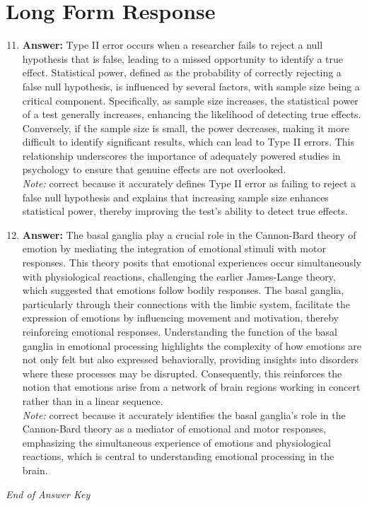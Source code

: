 \documentclass[12pt]{article}
\begin{document}
\section*{Long Form Response}
\begin{enumerate}[label=\arabic*.]
\setcounter{enumi}{10}
\item \textbf{Answer:} Type II error occurs when a researcher fails to reject a null hypothesis that is false, leading to a missed opportunity to identify a true effect. Statistical power, defined as the probability of correctly rejecting a false null hypothesis, is influenced by several factors, with sample size being a critical component. Specifically, as sample size increases, the statistical power of a test generally increases, enhancing the likelihood of detecting true effects. Conversely, if the sample size is small, the power decreases, making it more difficult to identify significant results, which can lead to Type II errors. This relationship underscores the importance of adequately powered studies in psychology to ensure that genuine effects are not overlooked.
\\ \textit{Note:} correct because it accurately defines Type II error as failing to reject a false null hypothesis and explains that increasing sample size enhances statistical power, thereby improving the test's ability to detect true effects.
\item \textbf{Answer:} The basal ganglia play a crucial role in the Cannon-Bard theory of emotion by mediating the integration of emotional stimuli with motor responses. This theory posits that emotional experiences occur simultaneously with physiological reactions, challenging the earlier James-Lange theory, which suggested that emotions follow bodily responses. The basal ganglia, particularly through their connections with the limbic system, facilitate the expression of emotions by influencing movement and motivation, thereby reinforcing emotional responses. Understanding the function of the basal ganglia in emotional processing highlights the complexity of how emotions are not only felt but also expressed behaviorally, providing insights into disorders where these processes may be disrupted. Consequently, this reinforces the notion that emotions arise from a network of brain regions working in concert rather than in a linear sequence.
\\ \textit{Note:} correct because it accurately identifies the basal ganglia's role in the Cannon-Bard theory as a mediator of emotional and motor responses, emphasizing the simultaneous experience of emotions and physiological reactions, which is central to understanding emotional processing in the brain.
\end{enumerate}

\vfill
\noindent\textit{End of Answer Key}
\end{document}
